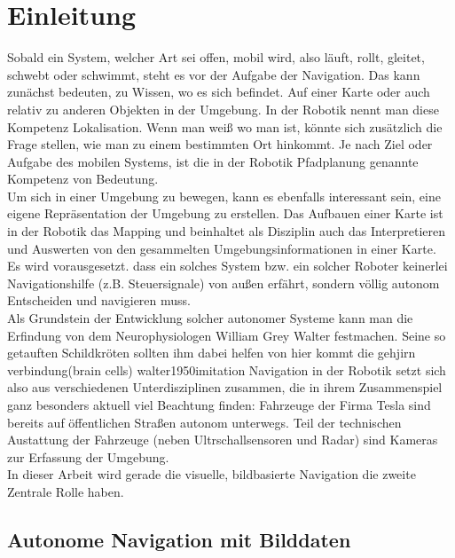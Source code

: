%


\chapter{Einleitung}



Sobald ein System, welcher Art sei offen, mobil wird, also läuft, rollt, gleitet, schwebt oder schwimmt, steht es vor der Aufgabe der Navigation. Das kann zunächst bedeuten, zu Wissen, wo es sich befindet. Auf einer Karte oder auch relativ zu anderen Objekten in der Umgebung. In der Robotik nennt man diese Kompetenz Lokalisation. Wenn man weiß wo man ist, könnte sich zusätzlich die Frage stellen, wie man zu einem bestimmten Ort hinkommt. Je nach Ziel oder Aufgabe des mobilen Systems, ist die in der Robotik Pfadplanung genannte Kompetenz von Bedeutung.\\ Um sich in einer Umgebung zu bewegen, kann es ebenfalls interessant sein, eine eigene Repräsentation der Umgebung zu erstellen. Das Aufbauen einer Karte ist in der Robotik das Mapping und beinhaltet als Disziplin auch das Interpretieren und Auswerten von den gesammelten Umgebungsinformationen in einer Karte.\\
Es wird vorausgesetzt. dass ein solches System bzw. ein solcher Roboter keinerlei Navigationshilfe (z.B. Steuersignale) von außen erfährt, sondern völlig autonom Entscheiden und navigieren muss.\\
Als Grundstein der Entwicklung solcher autonomer Systeme kann man die Erfindung von dem Neurophysiologen William Grey Walter festmachen. Seine so getauften \glqq Schildkröten \grqq{} sollten ihm dabei helfen
 von hier kommt die gehjirn verbindung(brain cells)		walter1950imitation
Navigation in der Robotik setzt sich also aus verschiedenen Unterdisziplinen zusammen, die in ihrem Zusammenspiel ganz besonders aktuell viel Beachtung finden: Fahrzeuge der Firma Tesla sind bereits auf öffentlichen Straßen autonom unterwegs. Teil der technischen Austattung der Fahrzeuge (neben Ultrschallsensoren und Radar) sind Kameras zur Erfassung der Umgebung. \\
In dieser Arbeit wird gerade die visuelle, bildbasierte Navigation die zweite Zentrale Rolle haben.


\section{Autonome Navigation mit Bilddaten}
\label{sec:Autonome Navigation mit Bilddaten}




